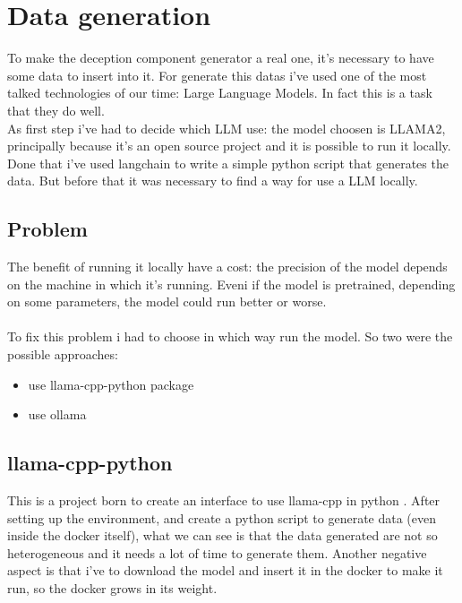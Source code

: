 \chapter{Data generation}
To make the deception component generator a real one, it's necessary to have some data to insert into it.
For generate this datas i've used one of the most talked technologies of our time: Large Language Models. In fact this is a task that they do well.
\\
As first step i've had to decide which LLM use: the model choosen is LLAMA2, principally because it's an open source project and it is possible to run it locally.
Done that i've used langchain \cite{langchain} to write a simple python script that generates the data. But before that it was necessary to find a way for use a LLM locally.
\section{Problem}
The benefit of running it locally have a cost: the precision of the model depends on the machine in which it's running. Eveni if the model is pretrained, depending on some parameters, the model could run better or worse.
\\\\
To fix this problem i had to choose in which way run the model. So two were the possible approaches:
\begin{itemize}
    \item use llama-cpp-python package
    \item use ollama
\end{itemize}
\section{llama-cpp-python}
This is a project born to create an interface to use llama-cpp in python \cite{llama-cpp-python}.
After setting up the environment, and create a python script to generate data (even inside the docker itself), what we can see is that the data generated are not so heterogeneous and it needs a lot of time to generate them.
Another negative aspect is that i've to download the model and insert it in the docker to make it run, so the docker grows in its weight.
